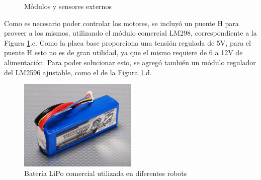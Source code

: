 \begin{figure}
    \centering
    \qquad
    \qquad
    \qquad
    \caption{Módulos y sensores externos}
    \label{fig:externalmodulesandsensors}
\end{figure}

Como es necesario poder controlar los motores, se incluyó un puente H para proveer a los mismos, utilizando el módulo comercial LM298, correspondiente a la Figura \ref{fig:externalmodulesandsensors}.c. Como la placa base proporciona una tensión regulada de 5V, para el puente H esto no es de gran utilidad, ya que el mismo requiere de 6 a 12V de alimentación. Para poder solucionar esto, se agregó también un módulo regulador del LM2596 ajustable, como el de la Figura \ref{fig:externalmodulesandsensors}.d.

\begin{figure}
    \centering
    \includegraphics[width=0.5\textwidth]{Img/LiPo3S.jpg}
    \caption{Batería LiPo comercial utilizada en diferentes robots}
    \label{fig:lipobattery}
\end{figure}
